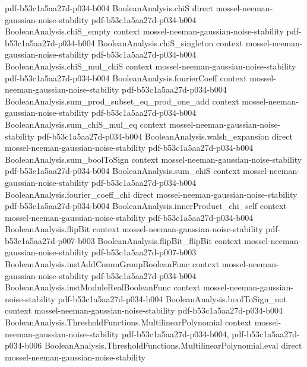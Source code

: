 \begin{theorem}
  {pdf-b53c1a5aa27d-p034-b004}
\proofstep
  {BooleanAnalysis.chiS}
  {direct}
  {mossel-neeman-gaussian-noise-stability}
  {pdf-b53c1a5aa27d-p034-b004}
\proofstep
  {BooleanAnalysis.chiS_empty}
  {context}
  {mossel-neeman-gaussian-noise-stability}
  {pdf-b53c1a5aa27d-p034-b004}
\proofstep
  {BooleanAnalysis.chiS_singleton}
  {context}
  {mossel-neeman-gaussian-noise-stability}
  {pdf-b53c1a5aa27d-p034-b004}
\proofstep
  {BooleanAnalysis.chiS_mul_chiS}
  {context}
  {mossel-neeman-gaussian-noise-stability}
  {pdf-b53c1a5aa27d-p034-b004}
\proofstep
  {BooleanAnalysis.fourierCoeff}
  {context}
  {mossel-neeman-gaussian-noise-stability}
  {pdf-b53c1a5aa27d-p034-b004}
\proofstep
  {BooleanAnalysis.sum_prod_subset_eq_prod_one_add}
  {context}
  {mossel-neeman-gaussian-noise-stability}
  {pdf-b53c1a5aa27d-p034-b004}
\proofstep
  {BooleanAnalysis.sum_chiS_mul_eq}
  {context}
  {mossel-neeman-gaussian-noise-stability}
  {pdf-b53c1a5aa27d-p034-b004}
\proofstep
  {BooleanAnalysis.walsh_expansion}
  {direct}
  {mossel-neeman-gaussian-noise-stability}
  {pdf-b53c1a5aa27d-p034-b004}
\proofstep
  {BooleanAnalysis.sum_boolToSign}
  {context}
  {mossel-neeman-gaussian-noise-stability}
  {pdf-b53c1a5aa27d-p034-b004}
\proofstep
  {BooleanAnalysis.sum_chiS}
  {context}
  {mossel-neeman-gaussian-noise-stability}
  {pdf-b53c1a5aa27d-p034-b004}
\proofstep
  {BooleanAnalysis.fourier_coeff_chi}
  {direct}
  {mossel-neeman-gaussian-noise-stability}
  {pdf-b53c1a5aa27d-p034-b004}
\proofstep
  {BooleanAnalysis.innerProduct_chi_self}
  {context}
  {mossel-neeman-gaussian-noise-stability}
  {pdf-b53c1a5aa27d-p034-b004}
\proofstep
  {BooleanAnalysis.flipBit}
  {context}
  {mossel-neeman-gaussian-noise-stability}
  {pdf-b53c1a5aa27d-p007-b003}
\proofstep
  {BooleanAnalysis.flipBit_flipBit}
  {context}
  {mossel-neeman-gaussian-noise-stability}
  {pdf-b53c1a5aa27d-p007-b003}
\proofstep
  {BooleanAnalysis.instAddCommGroupBooleanFunc}
  {context}
  {mossel-neeman-gaussian-noise-stability}
  {pdf-b53c1a5aa27d-p034-b004}
\proofstep
  {BooleanAnalysis.instModuleRealBooleanFunc}
  {context}
  {mossel-neeman-gaussian-noise-stability}
  {pdf-b53c1a5aa27d-p034-b004}
\proofstep
  {BooleanAnalysis.boolToSign_not}
  {context}
  {mossel-neeman-gaussian-noise-stability}
  {pdf-b53c1a5aa27d-p034-b004}
\proofstep
  {BooleanAnalysis.ThresholdFunctions.MultilinearPolynomial}
  {context}
  {mossel-neeman-gaussian-noise-stability}
  {pdf-b53c1a5aa27d-p034-b004,
    pdf-b53c1a5aa27d-p034-b006}
\proofstep
  {BooleanAnalysis.ThresholdFunctions.MultilinearPolynomial.eval}
  {direct}
  {mossel-neeman-gaussian-noise-stability}

\end{theorem}
